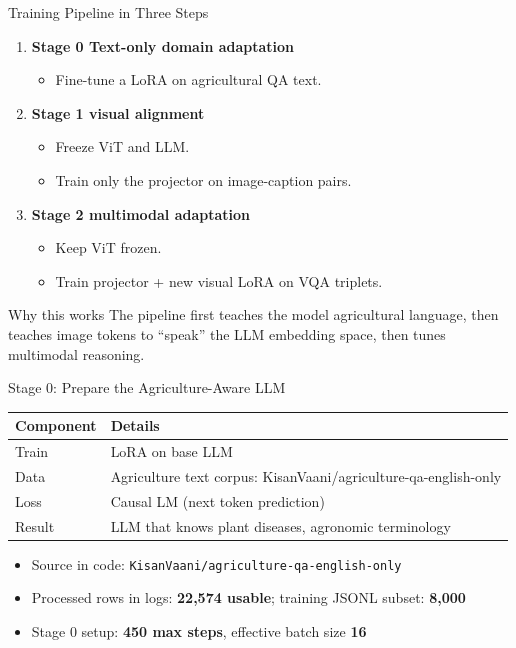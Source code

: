 \documentclass[aspectratio=169,11pt]{beamer}
\begin{document}
\begin{frame}{Training Pipeline in Three Steps}
\begin{enumerate}
    \item \textbf{Stage 0 Text-only domain adaptation}
    \begin{itemize}
        \item Fine-tune a LoRA on agricultural QA text.
    \end{itemize}
    \item \textbf{Stage 1 visual alignment}
    \begin{itemize}
        \item Freeze ViT and LLM.
        \item Train only the projector on image-caption pairs.
    \end{itemize}
    \item \textbf{Stage 2 multimodal adaptation}
    \begin{itemize}
        \item Keep ViT frozen.
        \item Train projector + new visual LoRA on VQA triplets.
    \end{itemize}
\end{enumerate}
\vspace{0.4em}
\begin{block}{Why this works}
The pipeline first teaches the model agricultural language, then teaches image tokens to ``speak'' the LLM embedding space, then tunes multimodal reasoning.
\end{block}
\end{frame}

\begin{frame}{Stage 0: Prepare the Agriculture-Aware LLM}
\begin{tabular}{ll}
\toprule
\textbf{Component} & \textbf{Details} \\
\midrule
Train  & LoRA on base LLM \\
Data   & Agriculture text corpus: KisanVaani/agriculture-qa-english-only \\
Loss   & Causal LM (next token prediction) \\
Result & LLM that knows plant diseases, agronomic terminology \\
\bottomrule
\end{tabular}
\vspace{0.4em}
\begin{itemize}
    \item Source in code: \texttt{KisanVaani/agriculture-qa-english-only}
    \item Processed rows in logs: \textbf{22,574 usable}; training JSONL subset: \textbf{8,000}
    \item Stage 0 setup: \textbf{450 max steps}, effective batch size \textbf{16}
\end{itemize}
\end{frame}
\end{document}
